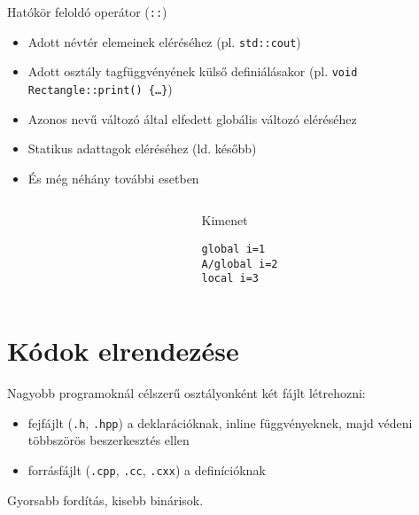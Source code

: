 \documentclass[usenames,dvipsnames,aspectratio=169]{beamer}
\begin{document}
\begin{frame}
    Hatókör feloldó operátor (\texttt{::})
    \begin{itemize}
        \item Adott névtér elemeinek eléréséhez (pl. \texttt{std::cout})
        \item Adott osztály tagfüggvényének külső definiálásakor (pl. \texttt{void Rectangle::print() \{\dots \}})
        \item Azonos nevű változó által elfedett globális változó eléréséhez
        \item Statikus adattagok eléréséhez (ld. később)
        \item És még néhány további esetben
    \end{itemize}
\end{frame}

\begin{frame}[fragile]
    \begin{columns}
        \begin{column}{0.75\textwidth}
            \begin{exampleblock}{}
                \scriptsize
                
            \end{exampleblock}
        \end{column}
        \begin{column}{0.25\textwidth}
            \begin{block}{Kimenet}
                \begin{verbatim}
global i=1
A/global i=2
local i=3
\end{verbatim}
            \end{block}
        \end{column}
    \end{columns}
\end{frame}

\section{Kódok elrendezése}

\begin{frame}
    Nagyobb programoknál célszerű osztályonként két fájlt létrehozni:
    \begin{itemize}
        \item fejfájlt (\texttt{.h}, \texttt{.hpp}) a deklarációknak, inline függvényeknek, majd védeni többszörös beszerkesztés ellen
        \item forrásfájlt (\texttt{.cpp}, \texttt{.cc}, \texttt{.cxx}) a definícióknak
    \end{itemize}
    Gyorsabb fordítás, kisebb binárisok.
    \begin{exampleblock}{}
        \footnotesize
        
    \end{exampleblock}
\end{frame}
\end{document}

